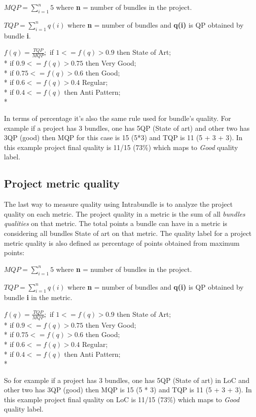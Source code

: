 \(MQP = \sum_{i=1}^{n} 5 \) where \textbf{n} = number of bundles in the project. \newline

\(TQP = \sum_{i=1}^{n} q(i) \) where \textbf{n} = number of bundles and \textbf{q(i)} is QP obtained by bundle \textbf{i}. \newline

 
\(
f(q) = \frac{TQP}{MQP};
\)
\newline
\newline
 if \( 1 <= f(q) > 0.9 \) then State of Art; \\*
 if \( 0.9 <= f(q) > 0.75 \) then Very Good; \\*
 if \( 0.75 <= f(q) > 0.6 \) then Good; \\*
 if \( 0.6 <= f(q) > 0.4 \) Regular; \\*
 if \( 0.4 <= f(q) \) then Anti Pattern;\\*

In terms of percentage it's also the same rule used for bundle's quality. For example if a project has 3 bundles, one has 5QP (State of art) and other two has 3QP (good) then MQP for this case is 15 (5*3) and TQP is 11 (5 + 3 + 3). In this example project final quality is 11/15 (73\%) which maps to \emph{Good} quality label. 

\subsection{Project metric quality}
\label{sec:project-quality-metric}
The last way to measure quality using Intrabundle is to analyze the project quality on each metric. The project quality in a metric is the sum of all \emph{bundles qualities} on that metric. The total points a bundle can have in a metric is considering all bundles State of art on that metric. The quality label for a project metric quality is also defined as percentage of points obtained from maximum points:

\(MQP = \sum_{i=1}^{n} 5 \) where \textbf{n} = number of bundles in the project. \newline

\(TQP = \sum_{i=1}^{n} q(i) \) where \textbf{n} = number of bundles and \textbf{q(i)} is QP obtained by bundle \textbf{i} in the metric. \newline

 
\(
f(q) = \frac{TQP}{MQP};
\)
\newline
\newline
 if \( 1 <= f(q) > 0.9 \) then State of Art; \\*
 if \( 0.9 <= f(q) > 0.75 \) then Very Good; \\*
 if \( 0.75 <= f(q) > 0.6 \) then Good; \\*
 if \( 0.6 <= f(q) > 0.4 \) Regular; \\*
 if \( 0.4 <= f(q) \) then Anti Pattern;\\*

So for example if a project has 3 bundles, one has 5QP (State of art) in LoC and other two has 3QP (good) then MQP is 15 (5 * 3) and TQP is 11 (5 + 3 + 3). In this example project final quality on LoC is 11/15 (73\%) which maps to \emph{Good} quality label.  

